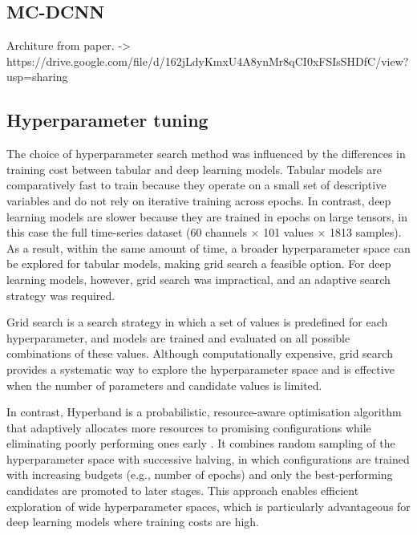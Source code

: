 

\subsection{MC-DCNN}\label{subsec:method-mc-dcnn}
Architure from paper. -> https://drive.google.com/file/d/162jLdyKmxU4A8ynMr8qCI0xFSIsSHDfC/view?usp=sharing


\subsection{Hyperparameter tuning}\label{subsec:method-hyperparam-tuning}
The choice of hyperparameter search method was influenced by the differences in training cost between tabular and deep learning models. Tabular models are comparatively fast to train because they operate on a small set of descriptive variables and do not rely on iterative training across epochs. In contrast, deep learning models are slower because they are trained in epochs on large tensors, in this case the full time-series dataset (60 channels $\times$ 101 values $\times$ 1813 samples). As a result, within the same amount of time, a broader hyperparameter space can be explored for tabular models, making grid search a feasible option. For deep learning models, however, grid search was impractical, and an adaptive search strategy was required.

Grid search is a search strategy in which a set of values is predefined for each hyperparameter, and models are trained and evaluated on all possible combinations of these values. Although computationally expensive, grid search provides a systematic way to explore the hyperparameter space and is effective when the number of parameters and candidate values is limited.

In contrast, Hyperband is a probabilistic, resource-aware optimisation algorithm that adaptively allocates more resources to promising configurations while eliminating poorly performing ones early \citep{Li2018Hyperband}. It combines random sampling of the hyperparameter space with successive halving, in which configurations are trained with increasing budgets (e.g., number of epochs) and only the best-performing candidates are promoted to later stages. This approach enables efficient exploration of wide hyperparameter spaces, which is particularly advantageous for deep learning models where training costs are high.

